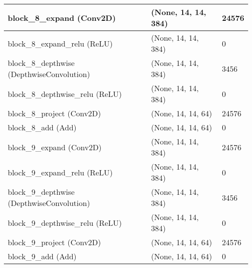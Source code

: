 \documentclass{article}
\begin{document}
\begin{center}
\begin{longtable}[h]{ p{}  p{}  p{}}
block\_8\_expand (Conv2D)                          & (None, 14, 14, 384)  & 24576    \\ \hline
block\_8\_expand\_relu (ReLU)                      & (None, 14, 14, 384)  & 0        \\ \hline
block\_8\_depthwise (DepthwiseConvolution)         & (None, 14, 14, 384)  & 3456     \\ \hline
block\_8\_depthwise\_relu (ReLU)                   & (None, 14, 14, 384)  & 0        \\ \hline
block\_8\_project (Conv2D)                         & (None, 14, 14, 64)   & 24576    \\ \hline
block\_8\_add (Add)                                & (None, 14, 14, 64)   & 0        \\ \hline
block\_9\_expand (Conv2D)                          & (None, 14, 14, 384)  & 24576    \\ \hline
block\_9\_expand\_relu (ReLU)                      & (None, 14, 14, 384)  & 0        \\ \hline
block\_9\_depthwise (DepthwiseConvolution)         & (None, 14, 14, 384)  & 3456     \\ \hline
block\_9\_depthwise\_relu (ReLU)                   & (None, 14, 14, 384)  & 0        \\ \hline
block\_9\_project (Conv2D)                         & (None, 14, 14, 64)   & 24576    \\ \hline
block\_9\_add (Add)                                & (None, 14, 14, 64)   & 0        \\ \hline

\end{longtable}
\end{center}
\end{document}
